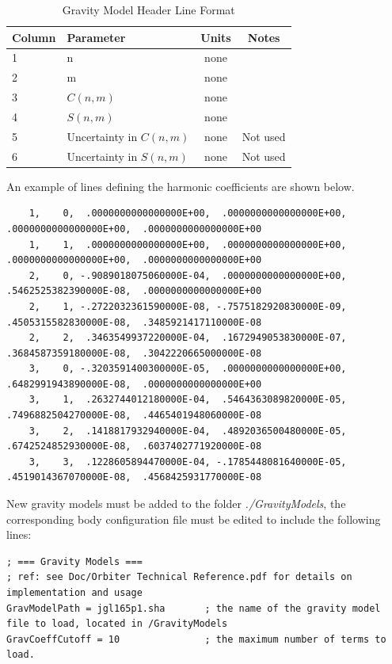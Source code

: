 \documentclass[Orbiter Technical Reference.tex]{subfiles}
\begin{document}
\begin{table}[h]
\begin{tabular}{llcc}
Column	&Parameter                        				&Units      			& Notes     \\\hline
1		&n                							&none        			&           \\
2		&m 								&none 			&           \\
3		&$C(n,m)$							&none           		&  \\
4		&$S(n,m)$ 							&none           		&		\\
5		&Uncertainty in $C(n,m)$	 				&none				&Not used		\\
6		&Uncertainty in $S(n,m)$					&none				&Not used	
\end{tabular}
\caption{Gravity Model Header Line Format}
\label{tab:coefflinefmat}
\end{table}



An example of lines defining the harmonic coefficients are shown below.
\begin{tiny}
\begin{verbatim}
    1,    0,  .0000000000000000E+00,  .0000000000000000E+00,  .0000000000000000E+00,  .0000000000000000E+00             
    1,    1,  .0000000000000000E+00,  .0000000000000000E+00,  .0000000000000000E+00,  .0000000000000000E+00             
    2,    0, -.9089018075060000E-04,  .0000000000000000E+00,  .5462525382390000E-08,  .0000000000000000E+00             
    2,    1, -.2722032361590000E-08, -.7575182920830000E-09,  .4505315582830000E-08,  .3485921417110000E-08             
    2,    2,  .3463549937220000E-04,  .1672949053830000E-07,  .3684587359180000E-08,  .3042220665000000E-08             
    3,    0, -.3203591400300000E-05,  .0000000000000000E+00,  .6482991943890000E-08,  .0000000000000000E+00             
    3,    1,  .2632744012180000E-04,  .5464363089820000E-05,  .7496882504270000E-08,  .4465401948060000E-08             
    3,    2,  .1418817932940000E-04,  .4892036500480000E-05,  .6742524852930000E-08,  .6037402771920000E-08             
    3,    3,  .1228605894470000E-04, -.1785448081640000E-05,  .4519014367070000E-08,  .4568425931770000E-08             
\end{verbatim}
\end{tiny}
New gravity models must be added to the folder \emph{./GravityModels}, the corresponding body configuration file must be edited to include the following lines:
\begin{tiny}
\begin{verbatim}
; === Gravity Models ===
; ref: see Doc/Orbiter Technical Reference.pdf for details on implementation and usage
GravModelPath = jgl165p1.sha       ; the name of the gravity model file to load, located in /GravityModels
GravCoeffCutoff = 10               ; the maximum number of terms to load.
\end{verbatim}
\end{tiny}
\end{document}
